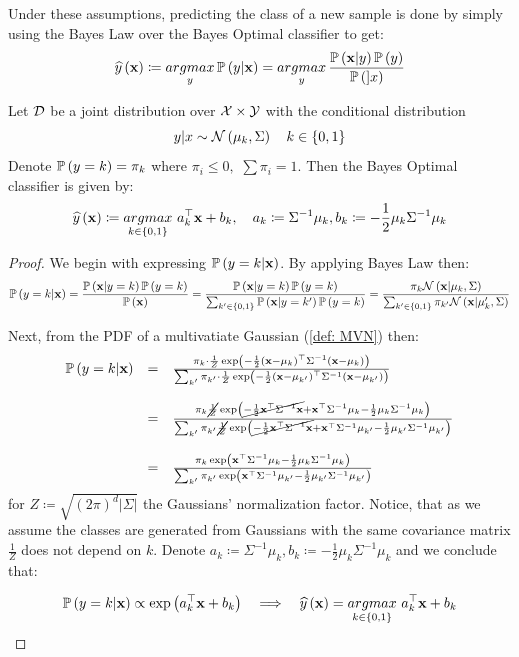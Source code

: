 Under these assumptions, predicting the class of a new sample is done by simply using the Bayes Law over the Bayes Optimal classifier to get:
$$ \widehat{y}\left(\mathbf{x}\right) \coloneqq \underset{y}{argmax}\,\mathbb{P}\left(y|\mathbf{x}\right) = \underset{y}{argmax}\,\frac{\mathbb{P}\left(\mathbf{x}|y\right)\mathbb{P}\left(y\right)}{\mathbb{P}\left(]x\right)} $$

\begin{claim}
Let $\mathcal{D}$ be a joint distribution over $\mathcal{X}\times \mathcal{Y}$ with the conditional distribution $$y|x\sim\mathcal{N}\left(\mu_k,\Sigma\right)\quad k\in\left\{0,1\right\}$$ Denote $\mathbb{P}\left(y=k\right)=\pi_k$ where $\pi_i\leq 0,\,\,\sum\pi_i = 1$. Then the Bayes Optimal classifier is given by: $$ \widehat{y}\left(\mathbf{x}\right) \coloneqq \underset{k\in\left\{0,1\right\}}{argmax}\,\, a_k^\top \mathbf{x} + b_k, \quad a_k \coloneqq \Sigma^{-1}\mu_k, b_k\coloneqq -\frac{1}{2}\mu_k\Sigma^{-1}\mu_k $$ 
\end{claim}
\begin{proof}
We begin with expressing $\mathbb{P}\left(y=k|\mathbf{x}\right)$. By applying Bayes Law then:
$$
\mathbb{P}\left(y=k|\mathbf{x}\right) = 
\frac{\mathbb{P}\left(\mathbf{x}|y=k\right)\mathbb{P}\left(y=k\right)}{\mathbb{P}\left(\mathbf{x}\right)} = \frac{\mathbb{P}\left(\mathbf{x}|y=k\right)\mathbb{P}\left(y=k\right)}{\sum_{k'\in\left\{0,1\right\}}\mathbb{P}\left(\mathbf{x}|y=k'\right)\mathbb{P}\left(y=k\right)} = \frac{\pi_k\mathcal{N}\left(\mathbf{x}|\mu_k,\Sigma\right)}{\sum_{k'\in\left\{0,1\right\}}\pi_{k'}\mathcal{N}\left(\mathbf{x}|\mu_k',\Sigma\right)}
$$

Next, from the PDF of a multivatiate Gaussian (\ref{def: MVN}) then:
$$
\begin{array}{ccl}
\mathbb{P}\left(y=k|\mathbf{x}\right) & = & \frac{\pi_k\cdot\frac{1}{Z}\exp\left(-\frac{1}{2}\left(\mathbf{x}-\mu_k\right)^\top\Sigma^{-1}\left(\mathbf{x}-\mu_k\right)\right)}{\sum_{k'} \pi_{k'}\cdot\frac{1}{Z}\exp\left(-\frac{1}{2}\left(\mathbf{x}-\mu_{k'}\right)^\top\Sigma^{-1}\left(\mathbf{x}-\mu_{k'}\right)\right)} \\
&  & \\
& = & \frac{\pi_k\cancel{\frac{1}{Z}}\exp\left(\cancel{-\frac{1}{2}\mathbf{x}^\top\Sigma^{-1}\mathbf{x}} + \mathbf{x}^\top \Sigma^{-1}\mu_k - \frac{1}{2}\mu_k\Sigma^{-1}\mu_k\right)}{\sum_{k'}\pi_{k'}\cancel{\frac{1}{Z}}\exp\left(\cancel{-\frac{1}{2}\mathbf{x}^\top\Sigma^{-1}\mathbf{x}} + \mathbf{x}^\top \Sigma^{-1}\mu_{k'} - \frac{1}{2}\mu_{k'}\Sigma^{-1}\mu_{k'}\right)} \\
&  & \\
& = & \frac{\pi_k\exp\left(\mathbf{x}^\top \Sigma^{-1}\mu_k - \frac{1}{2}\mu_k\Sigma^{-1}\mu_k\right)}{\sum_{k'}\pi_{k'}\exp\left(\mathbf{x}^\top \Sigma^{-1}\mu_{k'} - \frac{1}{2}\mu_{k'}\Sigma^{-1}\mu_{k'}\right)} 
\end{array}
$$
for $Z\coloneqq \sqrt{\left(2\pi\right)^d\left|\Sigma\right|}$ the Gaussians' normalization factor. Notice, that as we assume the classes are generated from Gaussians with the same covariance matrix $\frac{1}{Z}$ does not depend on $k$. Denote $a_k \coloneqq \Sigma^{-1}\mu_k, b_k\coloneqq -\frac{1}{2}\mu_k\Sigma^{-1}\mu_k$ and we conclude that:

$$
\mathbb{P}\left(y=k|\mathbf{x}\right) \propto \exp\left(a_k^\top \mathbf{x} + b_k\right) \quad \Longrightarrow \quad \widehat{y}\left(\mathbf{x}\right) = \underset{k\in\left\{0,1\right\}}{argmax}\,\, a_k^\top \mathbf{x} + b_k
$$
\end{proof}

